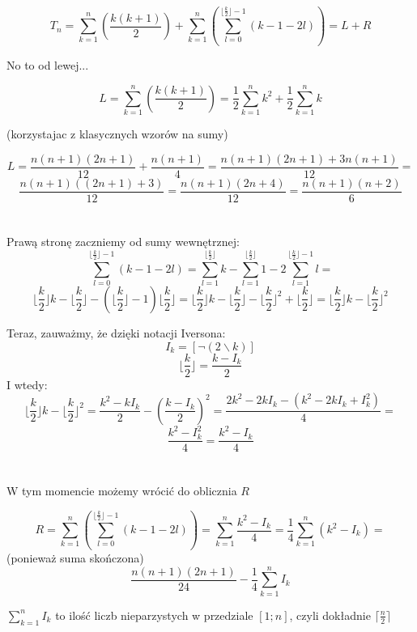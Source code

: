 \documentclass[a4paper,11pt]{article}
\begin{document}
\[
  T_{n} = \sum_{k=1}^{n} \left( \frac{k(k+1)}{2} \right) + \sum_{k=1}^{n} \left( \sum_{l=0}^{\lfloor \frac{k}{2} \rfloor - 1}(k - 1 - 2l) \right) = L + R
\]

No to od lewej...

\[
  L = \sum_{k=1}^{n} \left( \frac{k(k+1)}{2} \right) = \frac{1}{2}\sum_{k=1}^{n} k^{2} + \frac{1}{2}\sum_{k=1}^{n} k
\]

\tiny{ (korzystajac z klasycznych wzorów na sumy) }

\normalsize
\[
  L = \frac{n(n+1)(2n+1)}{12} + \frac{n(n+1)}{4} = \frac{n(n+1)(2n+1) + 3n(n+1)}{12} =
\]
\begin{equation}
  \frac{n(n+1)((2n+1) + 3)}{12} = \frac{n(n+1)(2n+4)}{12} = \frac{n(n+1)(n+2)}{6} \label{eq:L_ladne}
\end{equation} \\ \\


Prawą stronę zaczniemy od sumy wewnętrznej:
\[
  \sum_{l=0}^{\lfloor \frac{k}{2} \rfloor - 1}(k - 1 - 2l) = \sum_{l=1}^{\lfloor \frac{k}{2} \rfloor}k - \sum_{l=1}^{\lfloor \frac{k}{2} \rfloor} 1 - 2\sum_{l=1}^{\lfloor \frac{k}{2} \rfloor - 1} l =
\]
\[
  \lfloor \frac{k}{2} \rfloor k  - \lfloor \frac{k}{2} \rfloor - (\lfloor \frac{k}{2}  \rfloor - 1)\lfloor \frac{k}{2}  \rfloor =
  \lfloor \frac{k}{2} \rfloor k  - \lfloor \frac{k}{2} \rfloor - \lfloor \frac{k}{2}  \rfloor^2 + \lfloor \frac{k}{2}  \rfloor = 
  \lfloor \frac{k}{2} \rfloor k  - \lfloor \frac{k}{2}  \rfloor^2
\]

Teraz, zauważmy, że dzięki notacji Iversona:
\[
  I_{k} = [\neg (2 \backslash k)]
\]
\[
  \lfloor \frac{k}{2} \rfloor = \frac{k - I_{k}}{2}
\]
I wtedy:
\[
  \lfloor \frac{k}{2} \rfloor k  - \lfloor \frac{k}{2}  \rfloor^2 = \frac{k^2 - kI_{k}}{2} - \left( \frac{k - I_{k}}{2} \right)^2 =
  \frac{2k^2 - 2kI_{k} - (k^2 - 2kI_{k} + I_{k}^2)}{4} = 
\]
\[
  \frac{k^2 - I_{k}^2}{4} =  \frac{k^2 - I_{k}}{4} 
\]\\ \\

W tym momencie możemy wrócić do oblicznia $R$

\[
  R = \sum_{k=1}^{n} \left( \sum_{l=0}^{\lfloor \frac{k}{2} \rfloor - 1}(k - 1 - 2l) \right) = \sum_{k=1}^{n} \frac{k^2 - I_{k}}{4} = \frac{1}{4} \sum_{k=1}^{n} (k^2 - I_{k}) = 
\]
\tiny{(ponieważ suma skończona)} \normalsize
\[
  \frac{n(n+1)(2n+1)}{24} - \frac{1}{4} \sum_{k=1}^{n} I_{k}
\]

\noindent $\sum_{k=1}^{n} I_{k}$ to ilość liczb nieparzystych w przedziale $[1;n]$, czyli dokładnie $\lceil \frac{n}{2} \rceil$
\end{document}
